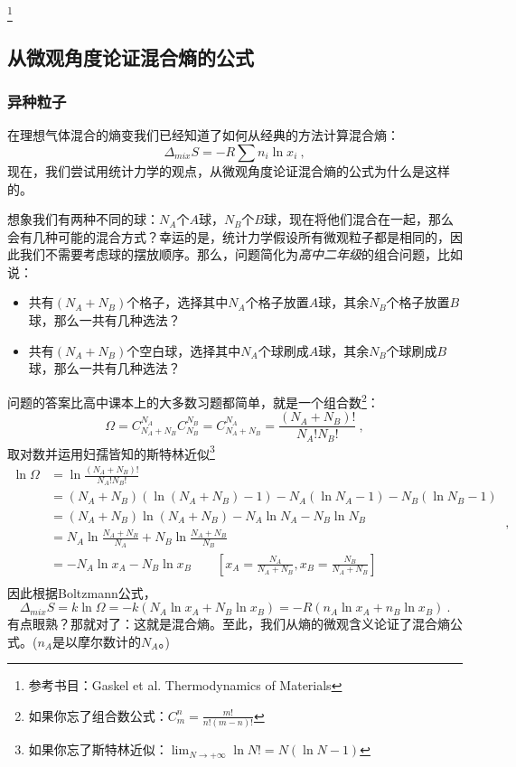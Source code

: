 


\footnote{参考书目：Gaskel et al. Thermodynamics of Materials}

\subsection{从微观角度论证混合熵的公式}
\subsubsection{异种粒子}
在理想气体混合的熵变我们已经知道了如何从经典的方法计算混合熵：
\begin{equation}
\Delta_{mix} S = - R \sum n_i \ln x_i~,
\end{equation}
现在，我们尝试用统计力学的观点，从微观角度论证混合熵的公式为什么是这样的。

想象我们有两种不同的球：$N_A$个$A$球，$N_B$个$B$球，现在将他们混合在一起，那么会有几种可能的混合方式？幸运的是，统计力学假设所有微观粒子都是相同的，因此我们不需要考虑球的摆放顺序。那么，问题简化为\textsl{高中二年级}的组合问题，比如说：
\begin{itemize}
\item 共有$(N_A+N_B)$个格子，选择其中$N_A$个格子放置$A$球，其余$N_B$个格子放置$B$球，那么一共有几种选法？
\item 共有$(N_A+N_B)$个空白球，选择其中$N_A$个球刷成$A$球，其余$N_B$个球刷成$B$球，那么一共有几种选法？
\end{itemize}
问题的答案比高中课本上的大多数习题都简单，就是一个组合数\footnote{如果你忘了组合数公式：$C^n_m = \frac{m!}{n!(m-n)!}$}：
\begin{equation}
\Omega = C^{N_A}_{N_A+N_B} C^{N_B}_{N_B} =  C^{N_A}_{N_A+N_B}  = \frac{(N_A+N_B)!}{N_A!N_B!}~,
\end{equation}
取对数并运用妇孺皆知的斯特林近似\footnote{如果你忘了斯特林近似：$\lim_{N \to +\infty} \ln N! = N (\ln N -1)$}
\begin{equation}
\begin{aligned}
\ln \Omega &= \ln \frac{(N_A+N_B)!}{N_A!N_B!} \\
 &= (N_A+N_B) (\ln (N_A+N_B) - 1) - N_A (\ln N_A - 1) - N_B (\ln N_B - 1) \\
 &= (N_A+N_B) \ln (N_A+N_B) - N_A \ln N_A - N_B \ln N_B \\
 &= N_A \ln \frac{N_A+N_B}{N_A} + N_B \ln \frac{N_A+N_B}{N_B} \\
 &= - N_A \ln x_A - N_B \ln x_B \qquad \left [x_A = \frac{N_A}{N_A+N_B}, x_B = \frac{N_B}{N_A+N_B} \right ]\\
\end{aligned}~,
\end{equation}
因此根据Boltzmann公式，
\begin{equation}
\Delta_{mix} S = k \ln \Omega = - k(N_A \ln x_A + N_B \ln x_B) = - R(n_A \ln x_A + n_B \ln x_B) ~.
\end{equation}
有点眼熟？那就对了：这就是混合熵。至此，我们从熵的微观含义论证了混合熵公式。($n_A$是以摩尔数计的$N_A$。)

